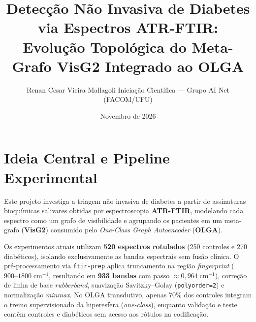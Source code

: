 \documentclass[11pt,a4paper]{article}
\title{\textbf{\color{ufublue}Detecção Não Invasiva de Diabetes via Espectros ATR-FTIR:\\
Evolução Topológica do Meta-Grafo VisG2 Integrado ao OLGA}}
\author{Renan Cesar Vieira Mallagoli \quad\textbar\quad Iniciação Científica — Grupo AI Net (FACOM/UFU)}
\date{Novembro de 2026}
\begin{document}
\maketitle
\vspace{-1.2em}

\section{Ideia Central e Pipeline Experimental}
Este projeto investiga a triagem não invasiva de diabetes a partir de assinaturas bioquímicas salivares obtidas por espectroscopia \textbf{ATR-FTIR}, modelando cada espectro como um grafo de visibilidade e agrupando os pacientes em um meta-grafo (\textbf{VisG2}) consumido pelo \textit{One-Class Graph Autoencoder} (\textbf{OLGA}).

Os experimentos atuais utilizam \textbf{520 espectros rotulados} (250 controles e 270 diabéticos), isolando exclusivamente as bandas espectrais sem fusão clínica. O pré-processamento via \texttt{ftir-prep} aplica truncamento na região \textit{fingerprint} ($900\text{--}1800\;\text{cm}^{-1}$, resultando em \textbf{933 bandas} com passo $\approx 0{,}964\;\text{cm}^{-1}$), correção de linha de base \textit{rubberband}, suavização Savitzky--Golay (\texttt{polyorder=2}) e normalização \textit{minmax}. No OLGA transdutivo, apenas 70\% dos controles integram o treino supervisionado da hiperesfera (\textit{one-class}), enquanto validação e teste contêm controles e diabéticos sem acesso aos rótulos na codificação.

\begin{center}
\end{center}
\end{document}

